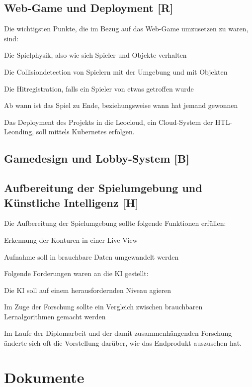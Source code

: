 \subsection{Web-Game und Deployment [R]}
Die wichtigsten Punkte, die im Bezug auf das Web-Game umzusetzen zu waren, sind:
\begin{compactitem}
    \item Die Spielphysik, also wie sich Spieler und Objekte verhalten
    \item Die Collisiondetection von Spielern mit der Umgebung und mit Objekten
    \item Die Hitregistration, falls ein Spieler von etwas getroffen wurde
    \item Ab wann ist das Spiel zu Ende, beziehungsweise wann hat jemand gewonnen
\end{compactitem} 
Das Deployment des Projekts in die Leocloud, ein Cloud-System der HTL-Leonding, soll mittels Kubernetes erfolgen.


\subsection{Gamedesign und Lobby-System [B]}

\subsection{Aufbereitung der Spielumgebung und Künstliche Intelligenz [H]}
Die Aufbereitung der Spielumgebung sollte folgende Funktionen erfüllen:
\begin{compactitem}
    \item Erkennung der Konturen in einer Live-View
    \item Aufnahme soll in brauchbare Daten umgewandelt werden
\end{compactitem}

Folgende Forderungen waren an die KI gestellt: 
\begin{compactitem}
    \item Die KI soll auf einem herausfordernden Niveau agieren
    \item Im Zuge der Forschung sollte ein Vergleich zwischen brauchbaren Lernalgorithmen gemacht werden
\end{compactitem}


Im Laufe der Diplomarbeit und der damit zusammenhängenden Forschung änderte sich oft die
Vorstellung darüber, wie das Endprodukt auszusehen hat.


\section{Dokumente}
